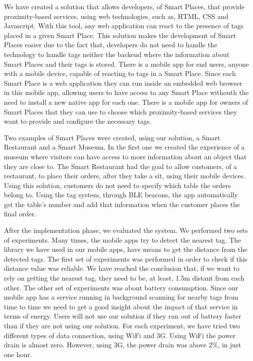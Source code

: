 We have created a solution that allows developers, of Smart Places, that provide proximity-based services, using web technologies, such as, \gls{HTML}, \gls{CSS} and Javascript.
With this tool, any web application can react to the presence of tags placed in a given Smart Place.
This solution makes the development of Smart Places easier due to the fact that, developers do not need to handle the technology to handle tags neither the backend where the information about Smart Places and their tags is stored.
There is a mobile app for end users, anyone with a mobile device, capable of reacting to tags in a Smart Place.
Since each Smart Place is a web application they can run inside an embedded web browser in this mobile app, allowing users to have access to any Smart Place withouth the need to install a new native app for each one.
There is a mobile app for owners of Smart Places that they can use to choose which proximity-based services they want to provide and configure the necessary tags.

Two examples of Smart Places were created, using our solution, a Smart Restaurant and a Smart Museum.
In the first one we created the experience of a museum where visitors can have access to more information about an object that they are close to.
The Smart Restaurant had the goal to allow customers, of a restaurant, to place their orders, after they take a sit, using their mobile devices.
Using this solution, customers do not need to specify which table the orders belong to. Using the tag system, through \gls{BLE} beacons, the app automatically get the table's number and add that information when the customer places the final order.

After the implementation phase, we evaluated the system.
We performed two sets of experiments.
Many times, the mobile apps try to detect the nearest tag.
The library we have used in our mobile apps, have means to get the distance from the detected tags.
The first set of experiments was performed in order to check if this distance value was reliable.
We have reached the conclusion that, if we want to rely on getting the nearest tag, they need to be, at least, 1.5m distant from each other.
The other set of experiments was about battery consumption.
Since our mobile app has a service running in background scanning for nearby tags from time to time we need to get a good insight about the impact of that service in terms of energy.
Users will not use our solution if they run out of battery faster than if they are not using our solution.
For each experiment, we have tried two different types of data connection, using \gls{WiFi} and \gls{3G}.
Using \gls{WiFi} the power drain is almost zero.
However, using \gls{3G}, the power drain was above 2\%, in just one hour.

